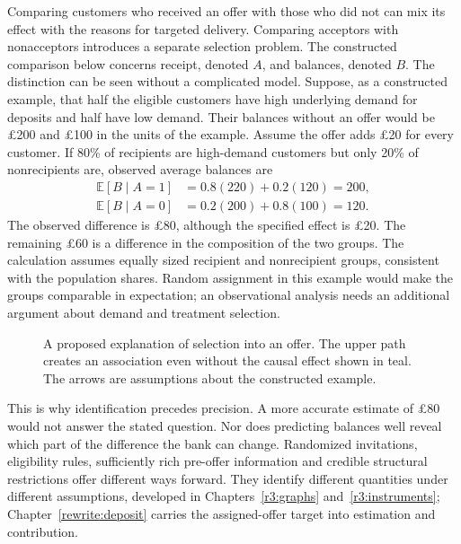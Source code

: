 Comparing customers who received an offer with those who did not can
mix its effect with the reasons for targeted delivery. Comparing acceptors
with nonacceptors introduces a separate selection problem. The constructed
comparison below concerns receipt, denoted $A$, and balances, denoted $B$. The distinction can
be seen without a complicated model. Suppose, as a constructed example, that
half the eligible customers have high underlying demand for deposits and half
have low demand. Their balances without an offer would be \pounds200 and
\pounds100 in the units of the example. Assume the offer adds \pounds20 for
every customer. If 80\% of recipients are high-demand customers but only 20\%
of nonrecipients are, observed average balances are
\begin{align*}
 \mathbb E[B\mid A=1]&=0.8(220)+0.2(120)=200,\\
 \mathbb E[B\mid A=0]&=0.2(200)+0.8(100)=120.
\end{align*}
The observed difference is \pounds80, although the specified effect is
\pounds20. The remaining \pounds60 is a difference in the composition of the
two groups. The calculation assumes equally sized recipient and nonrecipient
groups, consistent with the population shares. Random assignment in this
example would make the groups comparable in expectation; an observational
analysis needs an additional argument about demand and treatment selection.

\begin{figure}[htbp]\centering
{}
\caption{A proposed explanation of selection into an offer. The upper path
creates an association even without the causal effect shown in teal. The
arrows are assumptions about the constructed example.}
\label{reading:selection}
\end{figure}

This is why identification precedes precision. A more accurate estimate of
\pounds80 would not answer the stated question. Nor does predicting balances
well reveal which part of the difference the bank can change. Randomized
invitations, eligibility rules, sufficiently rich pre-offer information and
credible structural restrictions offer different ways forward. They identify
different quantities under different assumptions, developed in
Chapters~\ref{r3:graphs} and~\ref{r3:instruments}; Chapter~\ref{rewrite:deposit} carries the assigned-offer target into estimation and contribution.

